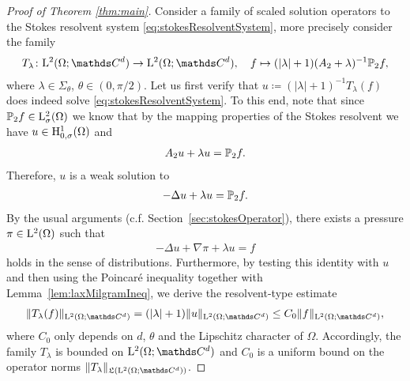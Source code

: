 \begin{proof}[Proof of Theorem \ref{thm:main}]
  Consider a family of scaled solution operators to the Stokes resolvent system \eqref{eq:stokesResolventSystem}, more precisely consider the family
  \begin{align*}
    T_\lambda \colon \Ell^2(\Omega; \C^d) \to \Ell^2(\Omega; \C^d), \quad f \mapsto (|\lambda| + 1) (A_2 + \lambda)^{-1} \PP_2 f,
  \end{align*}
  where $\lambda \in \Sigma_\theta$, $\theta \in (0, \pi/2)$.
  Let us first verify that $u \coloneqq (|\lambda| + 1)^{-1} T_\lambda(f)$ does indeed solve \eqref{eq:stokesResolventSystem}.
  To this end, note that since $\mathbb{P}_2 f \in \mathrm{L}^2_\sigma(\Omega)$ we know that by the mapping properties of the Stokes resolvent we have $u \in \mathrm{H}^1_{0,\sigma}(\Omega)$ and
  \begin{align*}
    A_2 u + \lambda u = \mathbb{P}_2 f.
  \end{align*}
  Therefore, $u$ is a weak solution to 
  \begin{align*}
    -\Delta u + \lambda u = \mathbb{P}_2 f.
  \end{align*}
  By the usual arguments (c.f. Section~\ref{sec:stokesOperator}), there exists a pressure $\pi \in \mathrm{L}^2(\Omega)$ such that 
  \begin{align*}
    -\Delta u + \nabla \pi + \lambda u = f
  \end{align*}
  holds in the sense of distributions.
  Furthermore, by testing this identity with $u$ and then using the Poincar\'e inequality together with Lemma~\ref{lem:laxMilgramIneq}, we derive the resolvent-type estimate
  \begin{align*}
    \| T_\lambda(f) \|_{\Ell^2(\Omega; \C^d)} = (|\lambda| + 1) \|u\|_{\Ell^2(\Omega; \C^d)}
    \leq C_0 \|f\|_{\Ell^2(\Omega; \C^d)},
  \end{align*}
  where $C_0$ only depends on $d$, $\theta$ and the Lipschitz character of $\Omega$.
  Accordingly, the family $T_\lambda$ is bounded on $\Ell^2(\Omega; \C^d)$ and $C_0$ is a uniform bound on the operator norms $\|T_\lambda\|_{\Li(\Ell^2(\Omega; \C^d))}$.


\end{proof}
